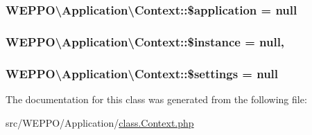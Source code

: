 \subsubsection[{\texorpdfstring{\$application}{$application}}]{\setlength{\rightskip}{0pt plus 5cm}W\+E\+P\+P\+O\textbackslash{}\+Application\textbackslash{}\+Context\+::\$application = null\hspace{0.3cm}{\ttfamily [protected]}}\hypertarget{classWEPPO_1_1Application_1_1Context_ab3700b2f265a2ec593495aad660bf48a}{}\label{classWEPPO_1_1Application_1_1Context_ab3700b2f265a2ec593495aad660bf48a}
\subsubsection[{\texorpdfstring{\$instance}{$instance}}]{\setlength{\rightskip}{0pt plus 5cm}W\+E\+P\+P\+O\textbackslash{}\+Application\textbackslash{}\+Context\+::\$instance = null\hspace{0.3cm}{\ttfamily [static]}, {\ttfamily [protected]}}\hypertarget{classWEPPO_1_1Application_1_1Context_a0ad428ed6ef409e12e02b390389ec901}{}\label{classWEPPO_1_1Application_1_1Context_a0ad428ed6ef409e12e02b390389ec901}
\subsubsection[{\texorpdfstring{\$settings}{$settings}}]{\setlength{\rightskip}{0pt plus 5cm}W\+E\+P\+P\+O\textbackslash{}\+Application\textbackslash{}\+Context\+::\$settings = null\hspace{0.3cm}{\ttfamily [protected]}}\hypertarget{classWEPPO_1_1Application_1_1Context_a0b4ba2876e5cfade11950d6db02f3810}{}\label{classWEPPO_1_1Application_1_1Context_a0b4ba2876e5cfade11950d6db02f3810}


The documentation for this class was generated from the following file\+:\begin{DoxyCompactItemize}
\item 
src/\+W\+E\+P\+P\+O/\+Application/\hyperlink{class_8Context_8php}{class.\+Context.\+php}\end{DoxyCompactItemize}
